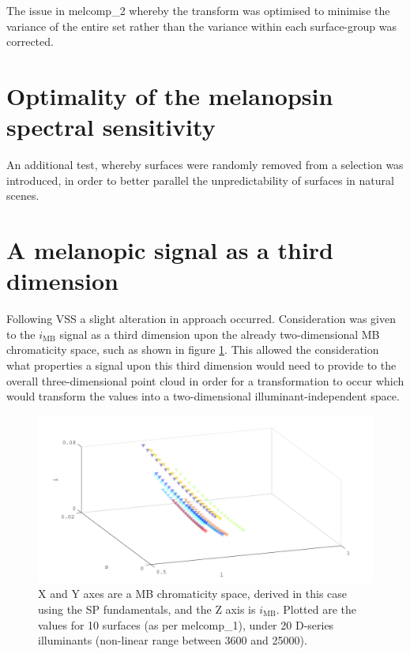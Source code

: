 The issue in melcomp\_2 whereby the transform was optimised to minimise the variance of the entire set rather than the variance within each surface-group was corrected.

\section{Optimality of the melanopsin spectral sensitivity}

An additional test, whereby surfaces were randomly removed from a selection was introduced, in order to better parallel the unpredictability of surfaces in natural scenes.


\section{A melanopic signal as a third dimension}

Following VSS a slight alteration in approach occurred. Consideration was given to the $i_{\text{MB}}$ signal as a third dimension upon the already two-dimensional \gls{MB} chromaticity space, such as shown in figure \ref{fig:ZL}. This allowed the consideration what properties a signal upon this third dimension would need to provide to the overall three-dimensional point cloud in order for a transformation to occur which would transform the values into a two-dimensional illuminant-independent space.

\begin{figure}[htbp]
 \includegraphics[max width=\textwidth]{figs/comp/melcomp_2/ZL.pdf}
 \caption{X and Y axes are a \gls{MB} chromaticity space, derived in this case using the SP fundamentals, and the Z axis is $i_{\text{MB}}$. Plotted are the values for 10 surfaces (as per melcomp\_1), under 20 D-series illuminants (non-linear range between 3600 and 25000).}
 \label{fig:ZL}
\end{figure} %

